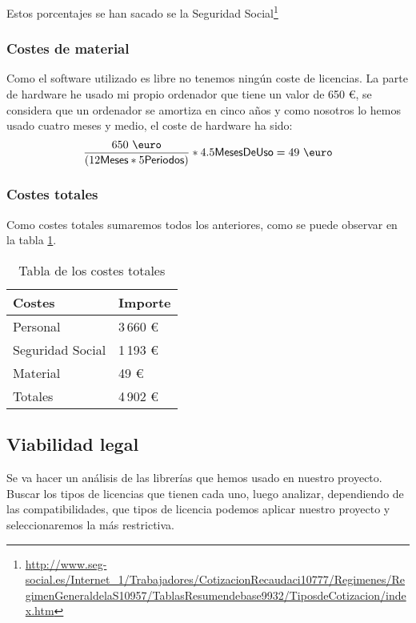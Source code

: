 Estos porcentajes se han sacado se la Seguridad Social\footnote{\url{http://www.seg-social.es/Internet_1/Trabajadores/CotizacionRecaudaci10777/Regimenes/RegimenGeneraldelaS10957/TablasResumendebase9932/TiposdeCotizacion/index.htm}}
\subsubsection{Costes de material}
Como el software utilizado es libre no tenemos ningún coste de licencias. La parte de hardware he usado mi propio ordenador que tiene un valor de 650 \euro, se considera que un ordenador se amortiza en cinco años y como nosotros lo hemos usado cuatro meses y medio, el coste de hardware ha sido:
\[\frac{650~{\mbox{\euro}}}{(12\textsf{Meses}*5\textsf{Periodos})}*4.5\textsf{MesesDeUso}=49~{\mbox{\euro}}\]
\subsubsection{Costes totales}
Como costes totales sumaremos todos los anteriores, como se puede observar en la tabla \ref{tab:costes}.

\begin{table}[]
\centering
\caption{Tabla de los costes totales}
\label{tab:costes}
\begin{tabular}{p{4cm} p{2cm}}
\toprule
Costes & Importe \\ \midrule
Personal         & 3\,660 \euro{}   \\ 
Seguridad Social & 1\,193 \euro{} \\ 
Material         & 49 \euro{}   \\ 
Totales             & 4\,902 \euro{} \\ \bottomrule
\end{tabular}
\end{table}

\subsection{Viabilidad legal}
Se va hacer un análisis de las librerías que hemos usado en nuestro proyecto. Buscar los tipos de licencias que tienen cada uno, luego analizar, dependiendo de las compatibilidades, que tipos de licencia podemos aplicar nuestro proyecto y seleccionaremos la más restrictiva.

